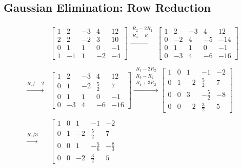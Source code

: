 \documentclass{article}
\begin{document}
\subsection*{Gaussian Elimination: Row Reduction}
\begin{align*}
&
\left[ 
    \begin{array}{cccc|c}
    1 & 2 & -3 & 4 & 12 \\
    2 & 2 & -2 & 3 & 10 \\
    0 & 1 & 1 & 0 & -1 \\
    1 & -1 & 1 & -2 & -4
    \end{array}
\right]
\xrightarrow{\substack{R_2 - 2R_1 \\ R_4 - R_1}}
\left[ 
    \begin{array}{cccc|c}
    1 & 2 & -3 & 4 & 12 \\
    0 & -2 & 4 & -5 & -14 \\
    0 & 1 & 1 & 0 & -1 \\
    0 & -3 & 4 & -6 & -16
    \end{array}
\right] \\ \\
\xrightarrow{R_2/-2}
&\left[ 
    \begin{array}{cccc|c}
    1 & 2 & -3 & 4 & 12 \\
    0 & 1 & -2 & \frac{5}{2} & 7 \\
    0 & 1 & 1 & 0 & -1 \\
    0 & -3 & 4 & -6 & -16
    \end{array}
\right]
\xrightarrow{\substack{R_1 - 2R_2 \\ R_3 - R_2 \\ R_4 + 3R_2}}
\left[ 
    \begin{array}{cccc|c}
    1 & 0 & 1 & -1 & -2 \\
    0 & 1 & -2 & \frac{5}{2} & 7 \\
    0 & 0 & 3 & -\frac{5}{2} & -8 \\
    0 & 0 & -2 & \frac{3}{2} & 5
    \end{array}
\right] \\ \\ 
\xrightarrow{R_3/3}
&\left[ 
    \begin{array}{cccc|c}
    1 & 0 & 1 & -1 & -2 \\
    0 & 1 & -2 & \frac{5}{2} & 7 \\
    0 & 0 & 1 & -\frac{5}{6} & -\frac{8}{3} \\
    0 & 0 & -2 & \frac{3}{2} & 5
    \end{array}

\end{align*}
\end{document}
